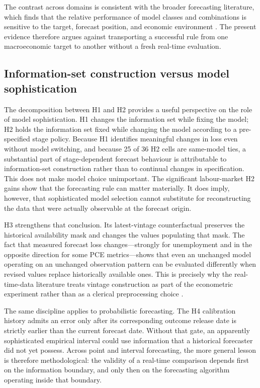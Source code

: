 The contrast across domains is consistent with the broader forecasting
literature, which finds that the relative performance of model classes and
combinations is sensitive to the target, forecast position, and economic
environment \citep{timmermann2006combinations,kuzin2013pooling,
kantpickwinter2025ml}.  The present evidence therefore argues against
transporting a successful rule from one macroeconomic target to another
without a fresh real-time evaluation.

\subsection{Information-set construction versus model sophistication}
\label{subsec:information_vs_model}

The decomposition between H1 and H2 provides a useful perspective on the role
of model sophistication.  H1 changes the information set while fixing the
model; H2 holds the information set fixed while changing the model according
to a pre-specified stage policy.  Because H1 identifies meaningful changes in
loss even without model switching, and because 25 of 36 H2 cells are
same-model ties, a substantial part of stage-dependent forecast behaviour is
attributable to information-set construction rather than to continual changes
in specification.  This does not make model choice unimportant.  The
significant labour-market H2 gains show that the forecasting rule can matter
materially.  It does imply, however, that sophisticated model selection cannot
substitute for reconstructing the data that were actually observable at the
forecast origin.

H3 strengthens that conclusion.  Its latest-vintage counterfactual preserves
the historical availability mask and changes the values populating that mask.
The fact that measured forecast loss changes---strongly for unemployment and
in the opposite direction for some PCE metrics---shows that even an unchanged
model operating on an unchanged observation pattern can be evaluated
differently when revised values replace historically available ones.  This is
precisely why the real-time-data literature treats vintage construction as
part of the econometric experiment rather than as a clerical preprocessing
choice \citep{croushorestark2001realtime,starkcroushore2002forecasting,
koenig2003useabuse}.

The same discipline applies to probabilistic forecasting.  The H4 calibration
history admits an error only after its corresponding outcome release date is
strictly earlier than the current forecast date.  Without that gate, an
apparently sophisticated empirical interval could use information that a
historical forecaster did not yet possess.  Across point and interval
forecasting, the more general lesson is therefore methodological: the validity
of a real-time comparison depends first on the information boundary, and only
then on the forecasting algorithm operating inside that boundary.


